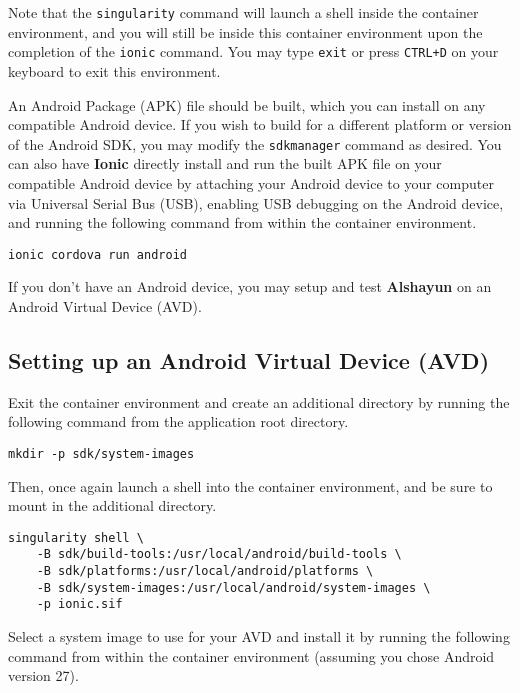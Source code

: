 \documentclass[12pt]{report}
\begin{document}
Note that the \texttt{singularity} command will launch a shell inside the
container environment, and you will still be inside this container environment
upon the completion of the \texttt{ionic} command. You may type \texttt{exit} or
press \texttt{CTRL+D} on your keyboard to exit this environment.

An Android Package (APK) file should be built, which you can install on any
compatible Android device. If you wish to build for a different platform or
version of the Android SDK, you may modify the \texttt{sdkmanager} command as
desired. You can also have \textbf{Ionic} directly install and run the built APK
file on your compatible Android device by attaching your Android device to your
computer via Universal Serial Bus (USB), enabling USB debugging on the Android
device, and running the following command from within the container environment.

\begin{verbatim}
ionic cordova run android
\end{verbatim}

If you don't have an Android device, you may setup and test \textbf{Alshayun} on
an Android Virtual Device (AVD).

        \subsection{Setting up an Android Virtual Device (AVD)}

Exit the container environment and create an additional directory by running the
following command from the application root directory.

\begin{verbatim}
mkdir -p sdk/system-images
\end{verbatim}

Then, once again launch a shell into the container environment, and be sure to
mount in the additional directory.

\begin{verbatim}
singularity shell \
    -B sdk/build-tools:/usr/local/android/build-tools \
    -B sdk/platforms:/usr/local/android/platforms \
    -B sdk/system-images:/usr/local/android/system-images \
    -p ionic.sif
\end{verbatim}

Select a system image to use for your AVD and install it by running the
following command from within the container environment (assuming you chose
Android version 27).
\end{document}
